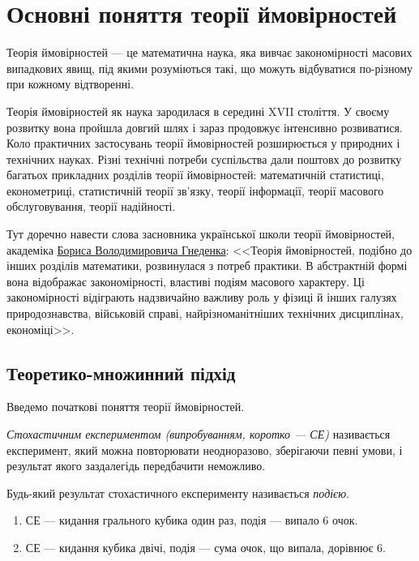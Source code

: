
\section{Основні поняття теорії ймовірностей}
Теорія ймовірностей --- це математична наука, яка вивчає закономірності масових випадкових явищ, під якими розуміються такі,
що можуть відбуватися по-різному при кожному відтворенні.

Теорія ймовірностей як наука зародилася в середині XVII століття. У своєму розвитку вона пройшла довгий шлях
і зараз продовжує інтенсивно розвиватися. Коло практичних застосувань теорії ймовірностей розширюється у природних і технічних науках.
Різні технічні потреби суспільства дали поштовх до розвитку багатьох прикладних розділів теорії ймовірностей: математичній статистиці,
економетриці, статистичній теорії зв'язку,
теорії інформації, теорії масового обслуговування, теорії надійності.

Тут доречно навести слова засновника української школи теорії ймовірностей,
академіка 
\href{https://uk.wikipedia.org/wiki/%D0%93%D0%BD%D1%94%D0%B4%D0%B5%D0%BD%D0%BA%D0%BE_%D0%91%D0%BE%D1%80%D0%B8%D1%81_%D0%92%D0%BE%D0%BB%D0%BE%D0%B4%D0%B8%D0%BC%D0%B8%D1%80%D0%BE%D0%B2%D0%B8%D1%87}{Бориса Володимировича Гнеденка}: 
<<Теорія ймовірностей, подібно до інших розділів математики, розвинулася з потреб практики.
В абстрактній формі вона відображає закономірності, властиві подіям масового характеру. Ці закономірності відіграють надзвичайно важливу
роль у фізиці й інших галузях природознавства, військовій справі, найрізноманітніших технічних дисциплінах, економіці>>.

\subsection{Теоретико-множинний підхід}
Введемо початкові поняття теорії ймовірностей.
\begin{definition}
    \emph{Стохастичним експериментом (випробуванням, коротко --- СЕ)} називається експеримент, 
    який можна повторювати неодноразово, зберігаючи певні умови, і результат якого 
    заздалегідь передбачити неможливо.
\end{definition}
\begin{definition}
    Будь-який результат стохастичного експерименту називається \emph{подією}.
\end{definition}
\begin{example}
    \begin{enumerate}
        \item СЕ --- кидання грального кубика один раз, подія --- випало 6 очок.
        \item СЕ --- кидання кубика двічі, подія --- сума очок, що випала, дорівнює 6.
    \end{enumerate}
\end{example}

